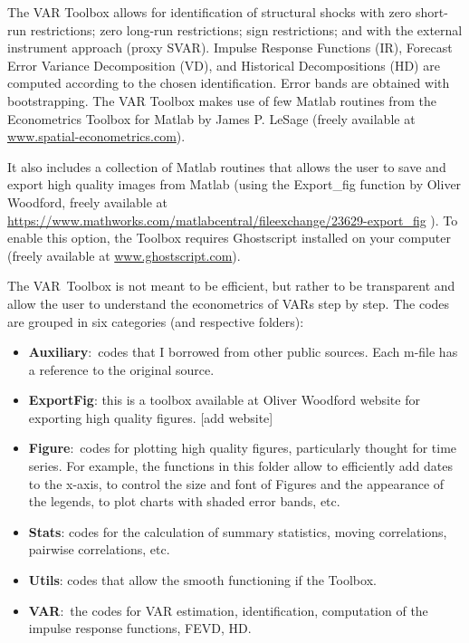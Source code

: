 \documentclass[10pt]{article}
\begin{document}
The VAR Toolbox allows for identification of structural shocks with zero
short-run restrictions; zero long-run restrictions; sign restrictions; and
with the external instrument approach (proxy SVAR). Impulse Response
Functions (IR), Forecast Error Variance Decomposition (VD), and Historical
Decompositions (HD) are computed according to the chosen identification.
Error bands are obtained with bootstrapping. The VAR Toolbox makes use of
few Matlab routines from the Econometrics Toolbox for Matlab by James P.
LeSage (freely available at \url{www.spatial-econometrics.com}).

It also includes a collection of Matlab routines that allows the user to
save and export high quality images from Matlab (using the Export\_fig
function by Oliver Woodford, freely available at %
\url{https://www.mathworks.com/matlabcentral/fileexchange/23629-export_fig}%
). To enable this option, the Toolbox requires Ghostscript installed on your
computer (freely available at \url{www.ghostscript.com}).

The VAR\ Toolbox is not meant to be efficient, but rather to be transparent
and allow the user to understand the econometrics of VARs step by step. The
codes are grouped in six categories (and respective folders):

\begin{itemize}
\item \textbf{Auxiliary}:\ codes that I borrowed from other public sources.
Each m-file has a reference to the original source.

\item \textbf{ExportFig}: this is a toolbox available at Oliver Woodford
website for exporting high quality figures. [add website]

\item \textbf{Figure}:\ codes for plotting high quality figures,
particularly thought for time series. For example, the functions in this
folder allow to efficiently add dates to the x-axis, to control the size and
font of Figures and the appearance of the legends, to plot charts with
shaded error bands, etc.

\item \textbf{Stats}: codes for the calculation of summary statistics,
moving correlations, pairwise correlations, etc.

\item \textbf{Utils}: codes that allow the smooth functioning if the Toolbox.

\item \textbf{VAR}:\ the codes for VAR estimation, identification,
computation of the impulse response functions, FEVD, HD.
\end{itemize}
\end{document}
